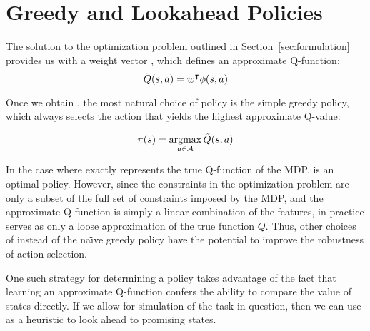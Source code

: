 \section{Greedy and Lookahead Policies}




The solution to the optimization problem outlined in Section~\ref{sec:formulation}
provides us with a weight vector \weights{}, which defines an approximate
Q-function:
\begin{equation}
  \tilde{Q}(s,a) = w^\intercal \phi({s}, {a})
\end{equation}


Once we obtain \approxq{}, the most natural choice of policy is the
simple greedy policy, which always selects the action that yields the highest
approximate Q-value:

\begin{equation}
  \pi(s) = \operatorname*{argmax}_{a \in \mathcal{A}} \tilde{Q}(s,a)
\end{equation}

In the case where \approxq{} exactly represents the true Q-function of the MDP,
\policyvar{} is an optimal policy. However, since the constraints in the optimization
problem are only a subset of the full set of constraints imposed by the MDP, and
the approximate Q-function is simply a linear combination of the features, in
practice \approxq{} serves as only a loose approximation of the true function
$Q$. Thus, other choices of \policyvar{} instead of the na\"{\i}ve greedy
policy have the potential to improve the robustness of action selection.

One such strategy for determining a policy takes advantage of the fact that
learning an approximate Q-function confers the ability to compare the value of
states directly. If we allow for simulation of the task in question, then we can
use \approxq{} as a heuristic to look ahead to promising states.

